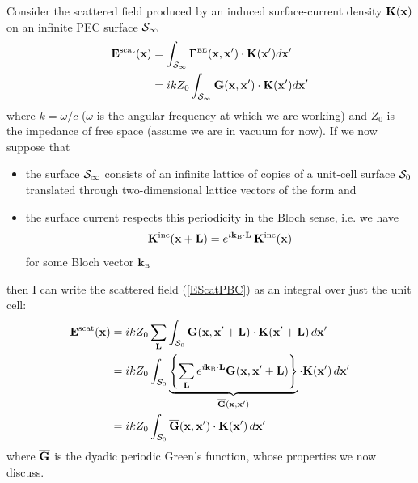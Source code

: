 \documentclass[letterpaper]{article}
\newcommand{\VBGBar}{\overline{\vb G}}
\newcommand{\KB}{\vb k\subt{B}}
\begin{document}
Consider the scattered field produced by an 
induced surface-current density $\mathbf{K}(\mathbf{x})$ on
an infinite PEC surface $\mathcal{S}_\infty$
\begin{align}
  \mathbf{E}^{\hbox{\scriptsize{scat}}}(\mathbf{x})
&=
  \int_{\mathcal{S}_\infty} 
   \boldsymbol{\Gamma}^{\hbox{\tiny{EE}}}(\mathbf{x}, \mathbf{x}^\prime)
   \cdot 
   \mathbf{K}(\mathbf{x}^\prime)d\mathbf{x}^\prime
\\
&=
  ikZ_0
  \int_{\mathcal{S}_\infty} 
   \mathbf{G}(\mathbf{x}, \mathbf{x}^\prime) 
   \cdot 
   \mathbf{K}(\mathbf{x}^\prime)d\mathbf{x}^\prime
\label{EScatPBC}
\end{align}
where $k=\omega/c$ ($\omega$ is the angular frequency
at which we are working) and $Z_0$ is the impedance
of free space (assume we are in vacuum for now).
If we now suppose that 
\begin{itemize}
 \item the surface $\mathcal{S}_\infty$ consists of an infinite lattice
       of copies of a unit-cell surface $\mathcal{S}_0$ translated through
       two-dimensional lattice vectors of the form 
       and
 \item the surface current respects this periodicity in the 
       Bloch sense, i.e. we have
       $$ \vb K\sups{inc}(\vb x+\vb L)
          = e^{i\KB \cdot \vb L} \, \vb K\sups{inc}(\vb x)
       $$
       for some Bloch vector $\KB$
\end{itemize}
then I can write the scattered field (\ref{EScatPBC}) as an integral
over just the unit cell:
\begin{align}
   \vb E\sups{scat}(\vb x)
&= ikZ_0 
   \sum_{\vb L}
   \int_{\mc S_0}
   \vb G(\vb x, \vb x^\prime+\vb L)
   \cdot 
   \vb K(\vb x^\prime + \vb L ) \, d\vb x^\prime
\nn
&= ikZ_0
   \int_{\mc S_0}
   \underbrace{
   \left\{
   \sum_{\vb L}
   e^{i\KB \cdot \vb L}
   \vb G(\vb x, \vb x^\prime+\vb L)
   \right\}
              }_{\VBGBar(\vb x, \vb x^\prime)}
   \cdot 
   \vb K(\vb x^\prime) \, d\vb x^\prime
\nn
&= ikZ_0 
   \int_{\mc S_0}
   \VBGBar(\vb x, \vb x^\prime)
   \cdot 
   \vb K(\vb x^\prime) \, d\vb x^\prime
\label{EScatPBC}
\end{align}
where $\VBGBar$ is the dyadic periodic Green's function,
whose properties we now discuss.

\end{document}
